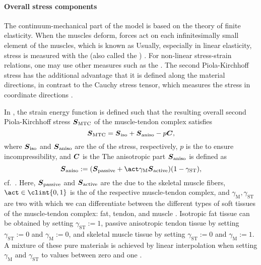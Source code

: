 \paragraph{Overall stress components}

The continuum-mechanical part of the model
is based on the theory of finite elasticity.
When the muscles deform, forces act on each infinitesimally small element
of the muscles, which is known as 
Usually, especially in linear elasticity,
stress is measured with the 
(also called the ) \cite{Soennerlind13Why}.
For non-linear stress-strain relations,
one may use other measures such as the
.
The second Piola-Kirchhoff stress has the additional advantage
that it is defined along the material directions,
in contrast to the Cauchy stress tensor,
which measures the stress in coordinate directions \cite{Soennerlind13Why}.

In ,
the strain energy function is defined such that the
resulting overall second Piola-Kirchhoff stress ${\boldsymbol{S}}_\mathrm{MTC}$ of
the muscle-tendon complex satisfies
\begin{equation}
  {\boldsymbol{S}}_\mathrm{MTC}
  = {\boldsymbol{S}}_\mathrm{iso} + {\boldsymbol{S}}_\mathrm{aniso} - p {\boldsymbol{C}},
\end{equation}
where ${\boldsymbol{S}}_\mathrm{iso}$ and ${\boldsymbol{S}}_\mathrm{aniso}$
are the  of the stress, respectively,
$p$ is the  to ensure incompressibility,
and ${\boldsymbol{C}}$ is the 
The anisotropic part ${\boldsymbol{S}}_\mathrm{aniso}$ is defined as
\begin{equation}
  \mat{S}_\mathrm{aniso}
  := (
    \mat{S}_\mathrm{passive} +
    \act \gamma_\mathrm{M} \mat{S}_\mathrm{active}
  ) (1 - \gamma_\mathrm{ST}),
\end{equation}
cf.\ \cite{Valentin18Gradient}.
Here, ${\boldsymbol{S}}_\mathrm{passive}$ and ${\boldsymbol{S}}_\mathrm{active}$
are the 
due to the skeletal muscle fibers,
$\act \in \clint{0, 1}$ is the  of the
respective muscle-tendon complex, and
$\gamma_\mathrm{M}, \gamma_\mathrm{ST}$ are two 
with which we can differentiate between the different types of soft tissues
of the muscle-tendon complex: fat, tendon, and muscle
\cite{Valentin18Gradient}.
Isotropic fat tissue can be obtained
by setting $\gamma_\mathrm{ST} := 1$,
passive anisotropic tendon tissue
by setting $\gamma_\mathrm{ST} := 0$ and $\gamma_\mathrm{M} := 0$, and
skeletal muscle tissue
by setting $\gamma_\mathrm{ST} := 0$ and $\gamma_\mathrm{M} := 1$.
A mixture of these pure materials is
achieved by linear interpolation when setting
$\gamma_\mathrm{M}$ and $\gamma_\mathrm{ST}$ to values between zero and one
\cite{Valentin18Gradient}.

